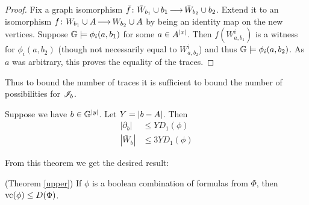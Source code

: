 \documentclass{amsart}
\begin{document}
\begin{proof}
  Fix a graph isomorphism $\bar f \colon \bar W_{b_1} \cup b_1 \operatorname{\longrightarrow} \bar W_{b_2} \cup b_2$.
  Extend it to an isomorphism $f \colon W_{b_1} \cup A \operatorname{\longrightarrow} W_{b_2} \cup A$ by being an identity map on the new vertices.
  Suppose $\mathbb G \models \phi_i(a, b_1)$ for some $a \in A^{|x|}$.
  Then $f(W^i_{a, b_1})$ is a witness for  $\phi_i(a, b_2)$ (though not necessarily equal to $W^i_{a, b_2}$)
  and thus $\mathbb G \models \phi_i(a, b_2)$.
  As $a$ was arbitrary, this proves the equality of the traces.
\end{proof}

Thus to bound the number of traces it is sufficient to bound the number of possibilities for $\mathscr I_b$.

\begin{Theorem} \label{main_bound}
  Suppose we have $b \in \mathbb G^{|y|}$.
  Let $Y = \left|b - A\right|$.
  Then
  \begin{align*}
    |\partial_b| &\leq Y D_1(\phi) \\ 
    |\bar W_b| &\leq 3 Y D_1(\phi)
  \end{align*}
\end{Theorem}

From this theorem we get the desired result:
\begin{Corollary} (Theorem \ref{upper})
  If $\phi$ is a boolean combination of formulas from $\Phi$, then $\operatorname{vc}(\phi) \leq D(\Phi)$.
\end{Corollary}
\end{document}

